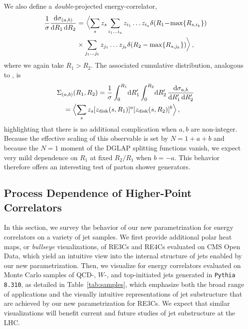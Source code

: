 We also define a \emph{double}-projected energy-correlator,
\begin{align}
    \label{eq:double_projected}
    \frac{1}{\sigma}
    \frac{\dd \sigma_{(a, b)}}{\dd R_1\, \dd R_2}
    &=
    \biggl\langle \sum_{\izero} z_{\izero}
    \sum_{i_1 \dots i_{a}}
    z_{i_1} \dots z_{i_{a}}
    \delta(R_1 \!-\! \max\{R_{\izero,i_k}\})
    \notag
    \\
    & \times
    \sum_{j_1 \dots j_{b}}
    z_{j_1} \dots z_{j_{b}}
    \delta (R_2 - \max\{R_{\izero,j_k}\}) \biggr\rangle
    \,,
\end{align}
where we again take $R_1>R_2$.
%
The associated cumulative distribution, analogous to , is
\begin{align}
    \label{eq:double_projected_cml}
    &
    \Sigma_{(a,b)}(R_1,R_2)
    =
    \frac{1}{\sigma}
    \int_0^{R_1}
    \!
    \dd R_1'   \int_0^{R_2}
    \!
    \dd R_2'
    \,
    \frac{\dd \sigma_{a,b}}{\dd R_1'\, \dd R_2'}
    \notag
    \\
    & \quad
    =
    \Bigl\langle \sum_{\izero}
    z_{\izero}
    [z_{\rm disk}(\izero,R_1)]^a [z_{\rm disk}(\izero,R_2)]^b \Bigr\rangle
    \,,
\end{align}
highlighting that there is no additional complication when $a,b$ are non-integer.
%
Because the effective scaling of this observable is set by $N = 1+a+b$ and because the $N= 1$ moment of the DGLAP splitting functions vanish, we expect very mild dependence on $R_1$ at fixed $R_2/R_1$ when $b = -a$.
%
This behavior therefore offers an interesting test of parton shower generators.



\subsection{Process Dependence of Higher-Point Correlators}
\label{sec:enc-pheno}

In this section, we survey the behavior of our new parametrization for energy correlators on a variety of jet samples.
%
We first provide additional polar heat maps, or \textit{bullseye} visualizations, of RE3Cs and RE4Cs evaluated on CMS Open Data, which yield an intuitive view into the internal structure of jets enabled by our new parametrization.
%
Then, we visualize for energy correlators evaluated on Monte Carlo samples of QCD-, \(W\)-, and top-initiated jets generated in \texttt{Pythia 8.310}, as detailed in Table~\ref{tab:samples}, which emphasize both the broad range of applications and the visually intuitive representations of jet substructure that are achieved by our new parametrization for RE3Cs.
%
We expect that similar visualizations will benefit current and future studies of jet substructure at the LHC.


